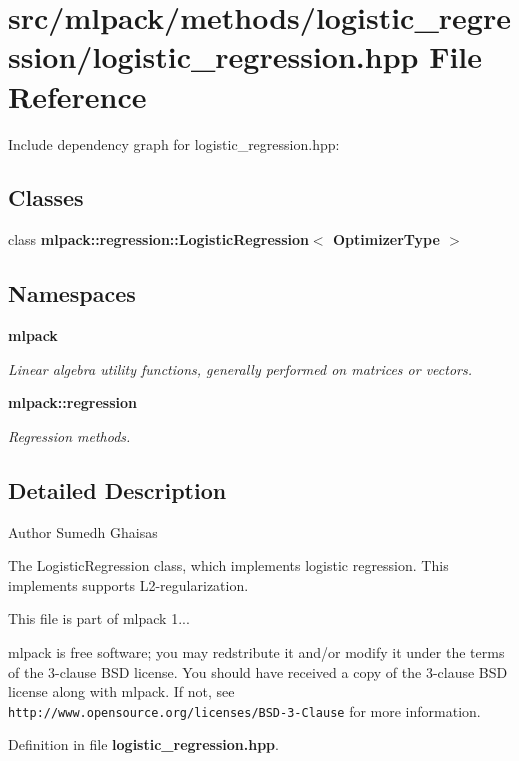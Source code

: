 \section{src/mlpack/methods/logistic\-\_\-regression/logistic\-\_\-regression.hpp File Reference}
\label{logistic__regression_8hpp}
Include dependency graph for logistic\-\_\-regression.\-hpp\-:
\subsection*{Classes}
\begin{DoxyCompactItemize}
\item 
class {\bf mlpack\-::regression\-::\-Logistic\-Regression$<$ Optimizer\-Type $>$}
\end{DoxyCompactItemize}
\subsection*{Namespaces}
\begin{DoxyCompactItemize}
\item 
{\bf mlpack}
\begin{DoxyCompactList}\small\item\em Linear algebra utility functions, generally performed on matrices or vectors. \end{DoxyCompactList}\item 
{\bf mlpack\-::regression}
\begin{DoxyCompactList}\small\item\em Regression methods. \end{DoxyCompactList}\end{DoxyCompactItemize}


\subsection{Detailed Description}
\begin{DoxyAuthor}{Author}
Sumedh Ghaisas
\end{DoxyAuthor}
The Logistic\-Regression class, which implements logistic regression. This implements supports L2-\/regularization.

This file is part of mlpack 1...

mlpack is free software; you may redstribute it and/or modify it under the terms of the 3-\/clause B\-S\-D license. You should have received a copy of the 3-\/clause B\-S\-D license along with mlpack. If not, see {\tt http\-://www.\-opensource.\-org/licenses/\-B\-S\-D-\/3-\/\-Clause} for more information. 

Definition in file {\bf logistic\-\_\-regression.\-hpp}.

